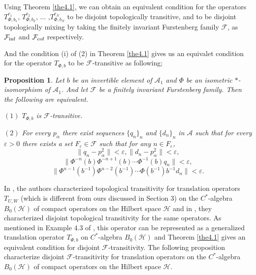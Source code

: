 \documentclass{article}
\newtheorem {proposition}[theorem]{Proposition}
\begin{document}
Using Theorem \ref{the4.1}, we can obtain an equivalent condition for the operators $T^{r_{1}}_{\Phi,b_{1}}$, $T^{r_{2}}_{\Phi,b_{2}}$, ... ,$T^{r_{N}}_{\Phi,b_{N}}$ to be disjoint topologically transitive, and
to be disjoint topologically mixing by taking the finitely invariant Furstenberg family $\mathcal{F}$, as $\mathcal{F}_{\textnormal{inf}}$ and $\mathcal{F}_{\textnormal{cof}}$ respectively.

And the condition (i) of (2) in Theorem \ref{the4.1} gives us an equivalet condition for the operator $T_{\Phi,b}$ to be $\mathcal{F}$-transitive as following; 

\begin{proposition}
Let $b$ be an invertible element of $\mathcal{A}_{1}$ and $\Phi$ be an isometric $\ast$-isomorphism of $\mathcal{A}_{1}$. And let $\mathcal{F}$ be a finitely invariant Furstenberg family. Then the following are equivalent.

$(1)$ $T_{\Phi, b}$ is $\mathcal{F}$-transitive.

$(2)$ For every $p_{\alpha}$ there exist sequences $\{q_{n}\}_{n}$ and $\{d_{n}\}_{n}$ in $\mathcal{A}$ such that for every $\varepsilon>0$ there exists a set $F_{\varepsilon}\in\mathcal{F}$ such that  for any $n\in F_{\varepsilon}$,
\[\|q_{n}-p^{2}_{\alpha}\|<\varepsilon, \|d_{n}-p^{2}_{\alpha}\|<\varepsilon,\]
\[\|\Phi^{-n}(b)\Phi^{-n+1}(b)\cdots \Phi^{-1}(b)q_{n}\|<\varepsilon,\]
\[\|\Phi^{n-1}(b^{-1})\Phi^{n-2}(b^{-1})\cdots\Phi(b^{-1})b^{-1}d_{n}\|<\varepsilon.\]
\end{proposition}

In \cite{IT21}, the authors characterized topological transitivity for translation operators $T_{U, W}$ (which is different from ours discussed in Section 3) on the $C^{\ast}$-algebra $B_{0}(\mathcal{H})$ of compact operators on the Hilbert space $\mathcal{H}$ and in \cite{IT23dis}, they characterized disjoint topological transitivity for the same operators. As mentioned in Example 4.3 of \cite{I24}, this operator can be represented as a generalized translation operator $T_{\Phi,b}$ on $C^{\ast}$-algebra $B_{0}(\mathcal{H})$ and Theorem \ref{the4.1} gives an equivalent condition for disjoint $\mathcal{F}$-transitivity. The following proposition characterize disjoint $\mathcal{F}$-transitivity for translation operators on the $C^{\ast}$-algebra $B_{0}(\mathcal{H})$ of compact operators on the Hilbert space $\mathcal{H}$.
\end{document}
